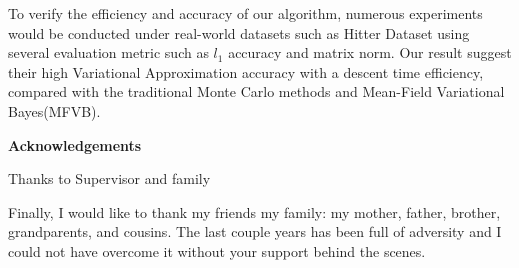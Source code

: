 To verify the efficiency and accuracy of our algorithm, numerous experiments would be conducted under real-world datasets such as Hitter Dataset using several evaluation metric such as $l_1$ accuracy and matrix norm.
Our result suggest their high Variational Approximation accuracy with a descent time efficiency, compared with the traditional Monte Carlo methods and Mean-Field Variational Bayes(MFVB).


\newpage

\begin{center}
    \textbf{\large Acknowledgements}\\
    \vspace{0.5cm}
\end{center}
   Thanks to Supervisor and family 

   Finally, I would like to thank my friends  my family: my mother, father, brother, grandparents, and cousins. The last couple years has been full of adversity and I could not have overcome it without your support behind the scenes.
   
\vfill
\hspace{0pt}
\pagebreak
\newpage